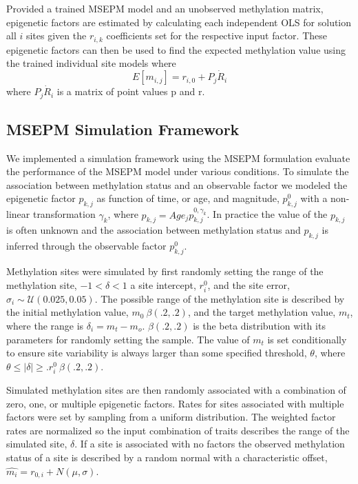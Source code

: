 \documentclass{article}
\begin{document}
{\begin{linenumbers}
Provided a trained MSEPM model and an unobserved methylation matrix, epigenetic factors are estimated by calculating each independent OLS for solution all $i$ 
sites given the $r_{i,k}$ coefficients set for the respective input factor.  These epigenetic factors can then be used to find the expected methylation value 
using the trained individual site models where $$E[m_{i,j}] = r_{i,0} + P_{j} \dot R_{i}$$ where $P_{j} \dot R_{i}$ is a matrix of point values p and r.

\subsection{MSEPM Simulation Framework}

We implemented a simulation framework using the MSEPM formulation evaluate the performance of the MSEPM model under various conditions.
To simulate the association between methylation status and an observable factor we modeled the 
epigenetic factor $p_{k,j}$ as function of time, or age, and magnitude, $p_{k,j}^0$ with a non-linear transformation $\gamma_{k}$, 
where $p_{k,j} = Age_j p_{k,j}^{0,\gamma_{k}}$. In practice the value of the $p_{k,j}$ is often unknown and the association between 
methylation status and $p_{k,j}$ is inferred through the observable factor $p_{k,j}^0$. 

Methylation sites were simulated by first randomly setting the range of the methylation site, 
$-1< \delta < 1$ a site intercept, $r^0_i$, and the site error, $\sigma_i \sim \mathcal{U}(0.025, 0.05)$. The possible 
range of the methylation site is described by the initial methylation value, $m_0 ~ \beta(.2,.2)$, 
and the target methylation value, $m_t$, where the range is $\delta_i = m_t - m_o$. $\beta(.2,.2)$ is the beta distribution with its parameters for randomly setting the sample.
The value of $m_t$ is set conditionally to ensure site variability is always larger than some specified threshold, $\theta$, where 
$ \theta \leq|\delta| \geq. r^0_i ~ \beta(.2,.2)$.


Simulated methylation sites are then randomly associated with a combination of zero, one, or multiple epigenetic factors. Rates for sites 
associated with multiple factors were set by sampling from a uniform distribution. The weighted factor rates are normalized so 
the input combination of traits describes the range of the simulated site, $\delta$. If a site is associated 
with no factors the observed methylation status of a site is described by a random normal with a characteristic offset, $\hat{m_i} = r_{0,i} + N(\mu, \sigma)$.
 



\end{linenumbers}}
\end{document}
